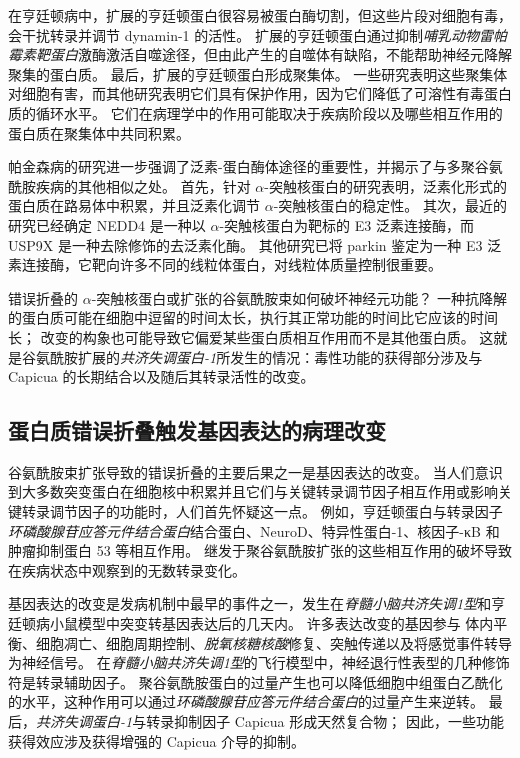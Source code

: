 在亨廷顿病中，扩展的亨廷顿蛋白很容易被蛋白酶切割，但这些片段对细胞有毒，会干扰转录并调节 dynamin-1 的活性。
扩展的亨廷顿蛋白通过抑制\textit{哺乳动物雷帕霉素靶蛋白}激酶激活自噬途径，但由此产生的自噬体有缺陷，不能帮助神经元降解聚集的蛋白质。
最后，扩展的亨廷顿蛋白形成聚集体。
一些研究表明这些聚集体对细胞有害，而其他研究表明它们具有保护作用，因为它们降低了可溶性有毒蛋白质的循环水平。
它们在病理学中的作用可能取决于疾病阶段以及哪些相互作用的蛋白质在聚集体中共同积累。


帕金森病的研究进一步强调了泛素-蛋白酶体途径的重要性，并揭示了与多聚谷氨酰胺疾病的其他相似之处。
首先，针对 $\alpha$-突触核蛋白的研究表明，泛素化形式的蛋白质在路易体中积累，并且泛素化调节 $\alpha$-突触核蛋白的稳定性。
其次，最近的研究已经确定 NEDD4 是一种以 $\alpha$-突触核蛋白为靶标的 E3 泛素连接酶，而 USP9X 是一种去除修饰的去泛素化酶。
其他研究已将 parkin 鉴定为一种 E3 泛素连接酶，它靶向许多不同的线粒体蛋白，对线粒体质量控制很重要。


错误折叠的 $\alpha$-突触核蛋白或扩张的谷氨酰胺束如何破坏神经元功能？
一种抗降解的蛋白质可能在细胞中逗留的时间太长，执行其正常功能的时间比它应该的时间长；
改变的构象也可能导致它偏爱某些蛋白质相互作用而不是其他蛋白质。
这就是谷氨酰胺扩展的\textit{共济失调蛋白-1}所发生的情况：毒性功能的获得部分涉及与 Capicua 的长期结合以及随后其转录活性的改变。



\subsection{蛋白质错误折叠触发基因表达的病理改变}

谷氨酰胺束扩张导致的错误折叠的主要后果之一是基因表达的改变。
当人们意识到大多数突变蛋白在细胞核中积累并且它们与关键转录调节因子相互作用或影响关键转录调节因子的功能时，人们首先怀疑这一点。
例如，亨廷顿蛋白与转录因子\textit{环磷酸腺苷应答元件结合蛋白}结合蛋白、NeuroD、特异性蛋白-1、核因子-κB 和肿瘤抑制蛋白 53 等相互作用。
继发于聚谷氨酰胺扩张的这些相互作用的破坏导致在疾病状态中观察到的无数转录变化。


基因表达的改变是发病机制中最早的事件之一，发生在\textit{脊髓小脑共济失调1型}和亨廷顿病小鼠模型中突变转基因表达后的几天内。
许多表达改变的基因参与  体内平衡、细胞凋亡、细胞周期控制、\textit{脱氧核糖核酸}修复、突触传递以及将感觉事件转导为神经信号。
在\textit{脊髓小脑共济失调1型}的飞行模型中，神经退行性表型的几种修饰符是转录辅助因子。
聚谷氨酰胺蛋白的过量产生也可以降低细胞中组蛋白乙酰化的水平，这种作用可以通过\textit{环磷酸腺苷应答元件结合蛋白}的过量产生来逆转。
最后，\textit{共济失调蛋白-1}与转录抑制因子 Capicua 形成天然复合物；
因此，一些功能获得效应涉及获得增强的 Capicua 介导的抑制。



